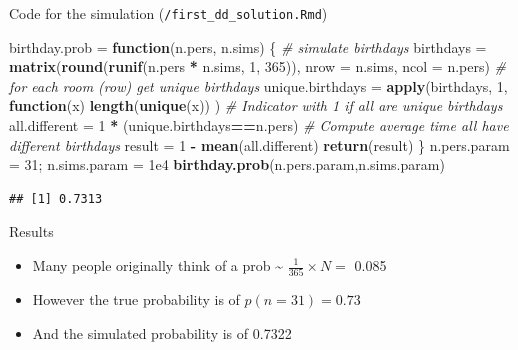 \documentclass[ignorenonframetext,]{beamer}
\newenvironment{Shaded}{\begin{snugshade}}{\end{snugshade}}
\newcommand{\CommentTok}[1]{\textcolor[rgb]{0.56,0.35,0.01}{\textit{#1}}}
\newcommand{\ControlFlowTok}[1]{\textcolor[rgb]{0.13,0.29,0.53}{\textbf{#1}}}
\newcommand{\DataTypeTok}[1]{\textcolor[rgb]{0.13,0.29,0.53}{#1}}
\newcommand{\DecValTok}[1]{\textcolor[rgb]{0.00,0.00,0.81}{#1}}
\newcommand{\FloatTok}[1]{\textcolor[rgb]{0.00,0.00,0.81}{#1}}
\newcommand{\KeywordTok}[1]{\textcolor[rgb]{0.13,0.29,0.53}{\textbf{#1}}}
\newcommand{\NormalTok}[1]{#1}
\newcommand{\OperatorTok}[1]{\textcolor[rgb]{0.81,0.36,0.00}{\textbf{#1}}}
\newcommand{\StringTok}[1]{\textcolor[rgb]{0.31,0.60,0.02}{#1}}
\providecommand{\tightlist}{%
  \setlength{\itemsep}{0pt}\setlength{\parskip}{0pt}}
\begin{document}
\begin{frame}[fragile]{Code for the simulation
(\texttt{/first\_dd\_solution.Rmd})}
\protect\hypertarget{code-for-the-simulation-first_dd_solution.rmd}{}

\begin{Shaded}
\begin{Highlighting}[]
\NormalTok{birthday.prob =}\StringTok{ }\ControlFlowTok{function}\NormalTok{(n.pers, n.sims) \{}
  \CommentTok{# simulate birthdays}
\NormalTok{  birthdays =}\StringTok{ }\KeywordTok{matrix}\NormalTok{(}\KeywordTok{round}\NormalTok{(}\KeywordTok{runif}\NormalTok{(n.pers }\OperatorTok{*}\StringTok{ }\NormalTok{n.sims, }
                                 \DecValTok{1}\NormalTok{, }\DecValTok{365}\NormalTok{)), }
                      \DataTypeTok{nrow =}\NormalTok{ n.sims, }\DataTypeTok{ncol =}\NormalTok{ n.pers)}
  \CommentTok{# for each room (row) get unique birthdays}
\NormalTok{  unique.birthdays =}\StringTok{ }\KeywordTok{apply}\NormalTok{(birthdays, }\DecValTok{1}\NormalTok{, }
                           \ControlFlowTok{function}\NormalTok{(x) }
                             \KeywordTok{length}\NormalTok{(}\KeywordTok{unique}\NormalTok{(x)) )}
  \CommentTok{# Indicator with 1 if all are unique birthdays}
\NormalTok{  all.different =}\StringTok{ }\DecValTok{1} \OperatorTok{*}\StringTok{ }\NormalTok{(unique.birthdays}\OperatorTok{==}\NormalTok{n.pers)}
  \CommentTok{# Compute average time all have different birthdays }
\NormalTok{  result =}\StringTok{ }\DecValTok{1} \OperatorTok{-}\StringTok{ }\KeywordTok{mean}\NormalTok{(all.different)}
\KeywordTok{return}\NormalTok{(result)}
\NormalTok{\}}
\NormalTok{n.pers.param =}\StringTok{ }\DecValTok{31}\NormalTok{; n.sims.param =}\StringTok{ }\FloatTok{1e4}
\KeywordTok{birthday.prob}\NormalTok{(n.pers.param,n.sims.param)}
\end{Highlighting}
\end{Shaded}

\begin{verbatim}
## [1] 0.7313
\end{verbatim}

\end{frame}

\begin{frame}{Results}
\protect\hypertarget{results}{}

\begin{itemize}
\tightlist
\item
  Many people originally think of a prob \textasciitilde{}
  \(\frac{1}{365} \times N =\) 0.085
\item
  However the true probability is of \(p(n= 31) = 0.73\)
\item
  And the simulated probability is of 0.7322
\end{itemize}

\end{frame}
\end{document}
